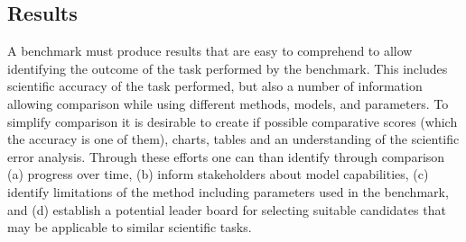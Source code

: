 \subsection{Results}
\label{subsec:towards-res}

A benchmark must produce results that are easy to comprehend to allow identifying the outcome of the task performed by the benchmark.
This includes scientific accuracy of the task performed, but also a number of information allowing comparison while using different methods, models, and parameters.
To simplify comparison it is desirable to create if possible comparative scores (which the accuracy is one of them), charts, tables and an understanding of the scientific error analysis.
Through these efforts one can than identify through comparison (a) progress over time, (b) inform stakeholders about model capabilities, (c) identify limitations of the method including parameters used in the benchmark, and (d) establish a potential leader board for selecting suitable candidates that may be applicable to similar scientific tasks.




